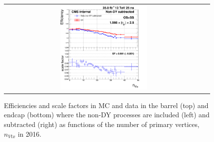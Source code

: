 \begin{figure}[bh]
\begin{center}
\begin{tabular}{cc}
      \includegraphics[width=0.45\textwidth]{figures/Zprime/2016/ScaleFactor/SameSign/nominal/g_compare_cut_nVtx_Endcap_ea_ta_exc_AS_nominal_PUW.png}
    \end{tabular}
    \caption{Efficiencies and scale factors in MC and data in the barrel (top) and endcap (bottom) where the non-DY processes are included (left) and subtracted (right) as functions of the number of primary vertices, $n_{Vtx}$ in 2016.}
    \label{fig:eff_SS_nominal_nVtx_2016}
  \end{center}
\end{figure}



